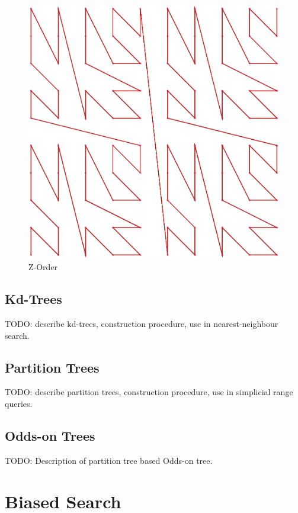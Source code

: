 \documentclass[mcs]{scsthesis}
\begin{document}
\begin{figure}
\begin{center}
\includegraphics[scale=0.4]{diagrams/zorder.eps}
\caption{Z-Order}
\end{center}
\end{figure}


\subsection{Kd-Trees}

TODO: describe kd-trees, construction procedure, use in nearest-neighbour
search.

\subsection{Partition Trees}

TODO: describe partition trees, construction procedure, use in simplicial
range queries.

\subsection{Odds-on Trees}

TODO: Description of partition tree based Odds-on tree.


\section{Biased Search}
\end{document}
